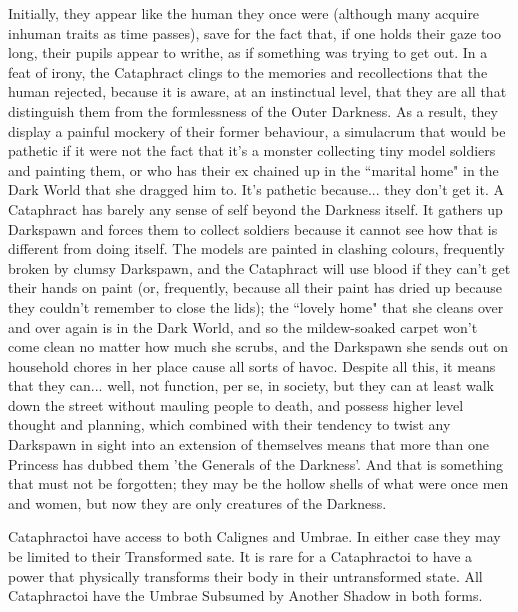 Initially, they appear like the human they once were (although many acquire inhuman traits as time passes), save for the fact that, if one holds their gaze too long, their pupils appear to writhe, as if something was trying to get out. In a feat of irony, the Cataphract clings to the memories and recollections that the human rejected, because it is aware, at an instinctual level, that they are all that distinguish them from the formlessness of the Outer Darkness. As a result, they display a painful mockery of their former behaviour, a simulacrum that would be pathetic if it were not the fact that it's a monster collecting tiny model soldiers and painting them, or who has their ex chained up in the \textquotedblleft marital home" in the Dark World that she dragged him to. It's pathetic because... they don't get it. A Cataphract has barely any sense of self beyond the Darkness itself. It gathers up Darkspawn and forces them to collect soldiers because it cannot see how that is different from doing itself. The 
models are painted in clashing colours, frequently broken by clumsy Darkspawn, and the Cataphract will use blood if they can't get their hands on paint (or, frequently, because all their paint has dried up because they couldn't remember to close the lids); the \textquotedblleft lovely home" that she cleans over and over again is in the Dark World, and so the mildew-soaked carpet won't come clean no matter how much she scrubs, and the Darkspawn she sends out on household chores in her place cause all sorts of havoc. Despite all this, it means that they can... well, not function, per se, in society, but they can at least walk down the street without mauling people to death, and possess higher level thought and planning, which combined with their tendency to twist any Darkspawn in sight into an extension of themselves means that more than one Princess has dubbed them 'the Generals of the Darkness'. And that is something that must not be forgotten; they may be the hollow shells of what were once men and women, 
but now they are only creatures of the Darkness.

Cataphractoi have access to both Calignes and Umbrae. In either case they may be limited to their Transformed sate. It is rare for a Cataphractoi to have a power that physically transforms their body in their untransformed state. All Cataphractoi have the Umbrae Subsumed by Another Shadow in both forms. 

